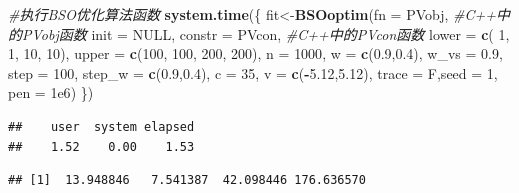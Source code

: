 \documentclass[]{ctexbook}
\newenvironment{Shaded}{\begin{snugshade}}{\end{snugshade}}
\newcommand{\KeywordTok}[1]{\textcolor[rgb]{0.13,0.29,0.53}{\textbf{#1}}}
\newcommand{\DataTypeTok}[1]{\textcolor[rgb]{0.13,0.29,0.53}{#1}}
\newcommand{\DecValTok}[1]{\textcolor[rgb]{0.00,0.00,0.81}{#1}}
\newcommand{\FloatTok}[1]{\textcolor[rgb]{0.00,0.00,0.81}{#1}}
\newcommand{\CommentTok}[1]{\textcolor[rgb]{0.56,0.35,0.01}{\textit{#1}}}
\newcommand{\OtherTok}[1]{\textcolor[rgb]{0.56,0.35,0.01}{#1}}
\newcommand{\OperatorTok}[1]{\textcolor[rgb]{0.81,0.36,0.00}{\textbf{#1}}}
\newcommand{\NormalTok}[1]{#1}
\theoremstyle{definition}
\theoremstyle{definition}
\theoremstyle{definition}
\theoremstyle{remark}
\begin{document}
\begin{Shaded}
\begin{Highlighting}[]
\CommentTok{#执行BSO优化算法函数}
\KeywordTok{system.time}\NormalTok{(\{}
\NormalTok{  fit<-}\KeywordTok{BSOoptim}\NormalTok{(}\DataTypeTok{fn =}\NormalTok{ PVobj, }\CommentTok{#C++中的PVobj函数}
         \DataTypeTok{init =} \OtherTok{NULL}\NormalTok{,}
         \DataTypeTok{constr =}\NormalTok{ PVcon, }\CommentTok{#C++中的PVcon函数}
         \DataTypeTok{lower =} \KeywordTok{c}\NormalTok{( }\DecValTok{1}\NormalTok{, }\DecValTok{1}\NormalTok{, }\DecValTok{10}\NormalTok{, }\DecValTok{10}\NormalTok{),}
         \DataTypeTok{upper =} \KeywordTok{c}\NormalTok{(}\DecValTok{100}\NormalTok{, }\DecValTok{100}\NormalTok{, }\DecValTok{200}\NormalTok{, }\DecValTok{200}\NormalTok{),}
         \DataTypeTok{n =} \DecValTok{1000}\NormalTok{,}
         \DataTypeTok{w =} \KeywordTok{c}\NormalTok{(}\FloatTok{0.9}\NormalTok{,}\FloatTok{0.4}\NormalTok{),}
         \DataTypeTok{w_vs =} \FloatTok{0.9}\NormalTok{,}
         \DataTypeTok{step =} \DecValTok{100}\NormalTok{,}
         \DataTypeTok{step_w =} \KeywordTok{c}\NormalTok{(}\FloatTok{0.9}\NormalTok{,}\FloatTok{0.4}\NormalTok{),}
         \DataTypeTok{c =} \DecValTok{35}\NormalTok{,}
         \DataTypeTok{v =} \KeywordTok{c}\NormalTok{(}\OperatorTok{-}\FloatTok{5.12}\NormalTok{,}\FloatTok{5.12}\NormalTok{),}
         \DataTypeTok{trace =}\NormalTok{ F,}\DataTypeTok{seed =} \DecValTok{1}\NormalTok{,}
         \DataTypeTok{pen =} \FloatTok{1e6}\NormalTok{)}
\NormalTok{\})}
\end{Highlighting}
\end{Shaded}

\begin{verbatim}
##    user  system elapsed 
##    1.52    0.00    1.53
\end{verbatim}

\begin{Shaded}
\end{Shaded}

\begin{verbatim}
## [1]  13.948846   7.541387  42.098446 176.636570
\end{verbatim}

\begin{Shaded}
\end{Shaded}
\end{document}

